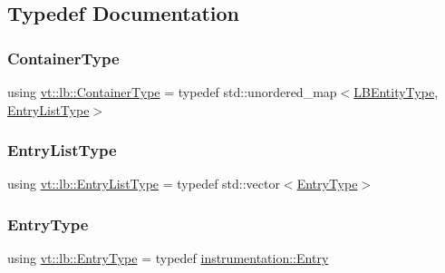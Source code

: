 \subsection{Typedef Documentation}
\mbox{\label{namespacevt_1_1lb_aaed3aa01cc192561401ff2c611b4252f}} 
\subsubsection{\texorpdfstring{Container\+Type}{ContainerType}}
{\footnotesize\ttfamily using \hyperlink{namespacevt_1_1lb_aaed3aa01cc192561401ff2c611b4252f}{vt\+::lb\+::\+Container\+Type} = typedef std\+::unordered\+\_\+map$<$\hyperlink{namespacevt_a92ec26fb6644cd0ba7eb0ee70c96bee5}{L\+B\+Entity\+Type}, \hyperlink{namespacevt_1_1lb_a3abc8cab13c374a70c47f262182d6ce2}{Entry\+List\+Type}$>$}

\mbox{\label{namespacevt_1_1lb_a3abc8cab13c374a70c47f262182d6ce2}} 
\subsubsection{\texorpdfstring{Entry\+List\+Type}{EntryListType}}
{\footnotesize\ttfamily using \hyperlink{namespacevt_1_1lb_a3abc8cab13c374a70c47f262182d6ce2}{vt\+::lb\+::\+Entry\+List\+Type} = typedef std\+::vector$<$\hyperlink{namespacevt_1_1lb_ab762a8296702082683628826ae4055cf}{Entry\+Type}$>$}

\mbox{\label{namespacevt_1_1lb_ab762a8296702082683628826ae4055cf}} 
\subsubsection{\texorpdfstring{Entry\+Type}{EntryType}}
{\footnotesize\ttfamily using \hyperlink{namespacevt_1_1lb_ab762a8296702082683628826ae4055cf}{vt\+::lb\+::\+Entry\+Type} = typedef \hyperlink{structvt_1_1lb_1_1instrumentation_1_1_entry}{instrumentation\+::\+Entry}}

\mbox{\label{namespacevt_1_1lb_af7c6ee21a7b3966b7ab64c5b626d30f8}} 
